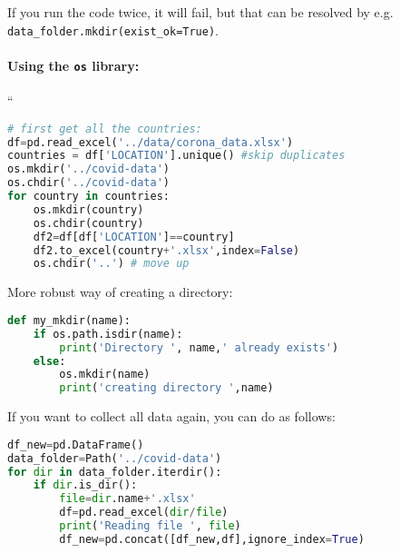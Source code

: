 \documentclass[graybox,sectrefs,envcountresetchap,open=right,final]{svmonodo}
\begin{document}
If you run the code twice, it will fail, but that can be resolved by e.g. \Verb!data_folder.mkdir(exist_ok=True)!.  

\paragraph{Using the \texttt{os} library:}
``












\begin{lstlisting}[language=python,style=blue1bar]
# first get all the countries:
df=pd.read_excel('../data/corona_data.xlsx')
countries = df['LOCATION'].unique() #skip duplicates
os.mkdir('../covid-data')
os.chdir('../covid-data')
for country in countries:
    os.mkdir(country)
    os.chdir(country)
    df2=df[df['LOCATION']==country]
    df2.to_excel(country+'.xlsx',index=False)
    os.chdir('..') # move up

\end{lstlisting}


More robust way of creating a directory:







\begin{lstlisting}[language=python,style=blue1bar]
def my_mkdir(name):
    if os.path.isdir(name):
        print('Directory ', name,' already exists')
    else:
        os.mkdir(name)
        print('creating directory ',name)

\end{lstlisting}


If you want to collect all data again, you can do as follows:









\begin{lstlisting}[language=python,style=blue1bar]
df_new=pd.DataFrame()
data_folder=Path('../covid-data')
for dir in data_folder.iterdir():
    if dir.is_dir():      
        file=dir.name+'.xlsx'
        df=pd.read_excel(dir/file)
        print('Reading file ', file)
        df_new=pd.concat([df_new,df],ignore_index=True)

\end{lstlisting}
\end{document}
